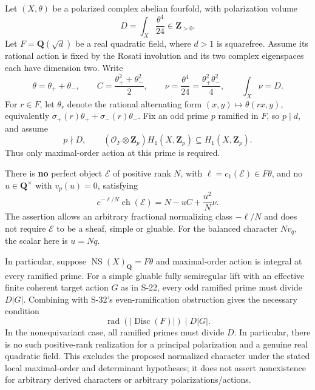 \begin{theorem}
\label{thm:semireg-odd-ramification}
Let \((X,\theta)\) be a polarized complex abelian fourfold, with polarization volume \[
 D=\int_X\frac{\theta^4}{24}\in\mathbf Z_{>0}.
\] Let \(F=\mathbf Q(\sqrt d)\) be a real quadratic field, where \(d>1\) is squarefree. Assume its rational action is fixed by the Rosati involution and its two complex eigenspaces each have dimension two. Write \[
 \theta=\theta_++\theta_-,\qquad
 C=\frac{\theta_+^2+\theta_-^2}{2},\qquad
 \nu=\frac{\theta^4}{24}
      =\frac{\theta_+^2\theta_-^2}{4},\qquad \int_X\nu=D.
 \tag{S33.1}
\] For \(r\in F\), let \(\theta_r\) denote the rational alternating form \((x,y)\mapsto\theta(rx,y)\), equivalently \(\sigma_+(r)\theta_++\sigma_-(r)\theta_-\). Fix an odd prime \(p\) ramified in \(F\), so \(p\mid d\), and assume \[
 p\nmid D,\qquad
 (\mathcal O_F\otimes\mathbf Z_p)H_1(X,\mathbf Z_p)
                  \subseteq H_1(X,\mathbf Z_p).
 \tag{S33.2}
\] Thus only maximal-order action at this prime is required.

There is \textbf{no} perfect object \(\mathcal E\) of positive rank \(N\), with \(\ell=c_1(\mathcal E)\in F\theta\), and no \(u\in\mathbf Q^\times\) with \(v_p(u)=0\), satisfying \[
 e^{-\ell/N}\operatorname{ch}(\mathcal E)
       =N-uC+\frac{u^2}{N}\nu.
 \tag{S33.3}
\] The assertion allows an arbitrary fractional normalizing class \(-\ell/N\) and does not require \(\mathcal E\) to be a sheaf, simple or gluable. For the balanced character \(Nv_q\), the scalar here is \(u=Nq\).

In particular, suppose \(\operatorname{NS}(X)_{\mathbf Q}=F\theta\) and maximal-order action is integral at every ramified prime. For a simple gluable fully semiregular lift with an effective finite coherent target action \(G\) as in S-22, every odd ramified prime must divide \(D|G|\). Combining with S-32's even-ramification obstruction gives the necessary condition \[
 \operatorname{rad}(|\operatorname{Disc}(F)|)\mid D|G|.
 \tag{S33.4}
\] In the nonequivariant case, all ramified primes must divide \(D\). In particular, there is no such positive-rank realization for a principal polarization and a genuine real quadratic field. This excludes the proposed normalized character under the stated local maximal-order and determinant hypotheses; it does not assert nonexistence for arbitrary derived characters or arbitrary polarizations/actions.
\end{theorem}
